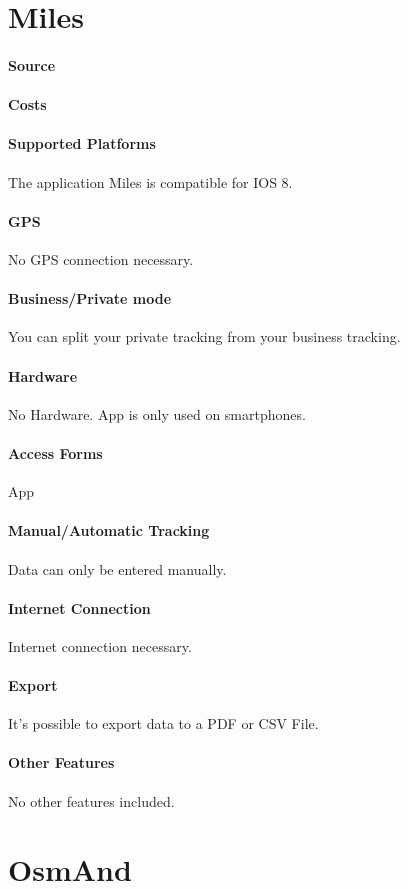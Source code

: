 \section{Miles}
\paragraph{Source} 
\paragraph{Costs} 
\paragraph{Supported Platforms} The application Miles is compatible for IOS 8.
\paragraph{GPS} No GPS connection necessary.
\paragraph{Business/Private mode} You can split your private tracking from your business tracking.
\paragraph{Hardware} No Hardware. App is only used on smartphones.
\paragraph{Access Forms} App
\paragraph{Manual/Automatic Tracking} Data can only be entered manually.
\paragraph{Internet Connection} Internet connection necessary.
\paragraph{Export} It’s possible to export data to a PDF or CSV File.
\paragraph{Other Features} No other features included.
\newpage
\section{OsmAnd}
